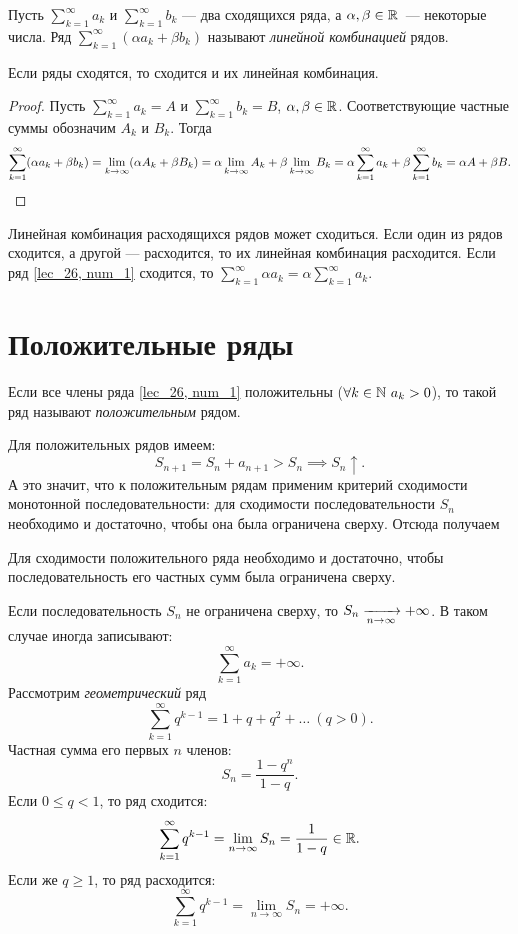 \documentclass[../../main.tex]{subfiles}
\begin{document}
Пусть $\sum\limits_{k = 1}^\infty a_k$  и $\sum\limits_{k = 1}^\infty b_k$
 --- два сходящихся ряда, а $\alpha, \beta \in \mathbb{R}$~--- некоторые числа.
Ряд $\sum\limits_{k = 1}^\infty(\alpha a_k + \beta b_k)$
 называют \emph{линейной комбинацией} рядов. 
\begin{thm}
Если ряды сходятся, то сходится и их линейная комбинация.
 \end{thm}
\begin{proof}
	Пусть  $\sum\limits_{k = 1}^\infty a_k = A$  
	и $\sum\limits_{k = 1}^\infty b_k = B$, \enspace
	 $\alpha, \beta \in \mathbb{R}$. Соответствующие частные суммы обозначим $A_k$ и 
	 $B_k$. Тогда
 	\[
 		\sum\limits_{k = 1}^\infty(\alpha a_k + \beta b_k) =
 		\lim\limits_{k \to \infty} (\alpha A_k + \beta B_k) =
 		\alpha\lim\limits_{k \to \infty} A_k +
 		\beta\lim\limits_{k \to \infty} B_k =
 		\alpha\sum\limits_{k = 1}^\infty a_k + 
 		\beta\sum\limits_{k = 1}^\infty b_k = \alpha A + 
 		\beta B. \qedhere
 	\]
 \end{proof}
 Линейная комбинация расходящихся рядов может сходиться.
 Если один из рядов сходится, а другой --- расходится, то их линейная 
 комбинация
 расходится. Если ряд \eqref{lec_26, num_1} сходится, 
 то $\sum\limits_{k=1}^\infty \alpha a_k = \alpha \sum\limits_{k=1}^\infty 
 a_k$.
 \section{Положительные ряды}
\begin{definition}
Если все члены ряда \eqref{lec_26, num_1} положительны
($\forall k \in \N \ a_k > 0$),
то такой ряд называют \emph{положительным} рядом.
\end{definition}
Для положительных рядов имеем:
\[
	S_{n+1} = S_n + a_{n+1}  > S_n \implies S_n \uparrow.
\]
А это значит, что к положительным рядам применим 
критерий сходимости монотонной последовательности: для сходимости 
последовательности $S_n$ необходимо и достаточно, чтобы она была ограничена 
сверху. Отсюда получаем
 \begin{thm} 
 	\label{lec26:pos_series}
 	 Для сходимости положительного ряда 
 	 необходимо и достаточно, чтобы 
 	 последовательность 
 	 его частных сумм была ограничена сверху.
 \end{thm}
 \begin{rem}
 	 Если  последовательность $S_n$ не ограничена сверху, 
 	 то  $S_n\xrightarrow[n \to \infty]{}{+\infty}$. В таком случае иногда записывают:
 	 \[
 		\sum\limits_{k = 1}^\infty a_k= +\infty
	.\]
	Рассмотрим \emph{геометрический} ряд
	 \[
 		\sum\limits_{k = 1}^\infty q^{k-1}=  1 + q + q^2 + \ldots
 		\ (q > 0).
	\]
	Частная сумма его первых $n$ членов:
	\[S_n = \frac{1 - q^n}{1 - q}.\]
	Если $0 \le q < 1$, то ряд сходится:
	\[
	\sum\limits_{k = 1}^\infty q^{k-1} = \lim\limits_{n \to \infty} S_n =
	\frac{1}{1 - q} \in \mathbb{R}
	.\]
	Если же $q \geq 1$, то ряд расходится:
	\[
	\sum\limits_{k = 1}^\infty q^{k-1} = \lim\limits_{n \to \infty} S_n =
	+ \infty
	.\]
 \end{rem}
\end{document}
